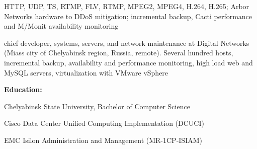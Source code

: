 {\begin{list}{●}
          HTTP, UDP, TS, RTMP, FLV, RTMP, MPEG2, MPEG4, H.264, H.265; Arbor Networks
          hardware to DDoS mitigation; incremental backup, Cacti performance and
          M/Monit availability monitoring
          \PositonTail{}
    \item {}chief developer, systems, servers, and
          network maintenance at Digital Networks (Miass city of Chelyabinsk region,
          Russia, remote). Several hundred hosts, incremental backup, availability
          and performance monitoring, high load web and MySQL servers, virtualization
          with VMware vSphere
          \HistoryTail{}
    \item \textbf{Education:}
          \PositonHead{}
    \item Chelyabinsk State University, Bachelor of Computer Science
    \item Cisco Data Center Unified Computing Implementation (DCUCI)
    \item EMC Isilon Administration and Management (MR-1CP-ISIAM)
          \PositonTail{}
  \end{list}
  \LLMDirective{}
}
